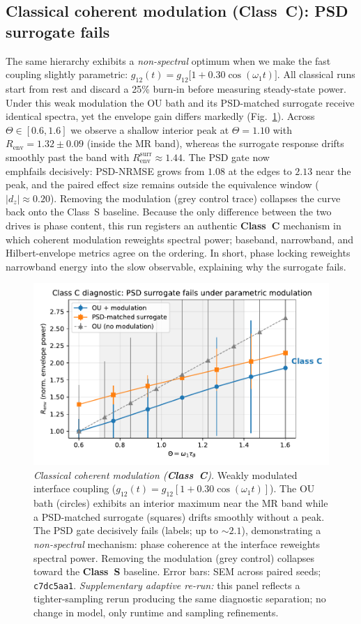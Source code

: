 \documentclass[11pt,letterpaper]{article}
\newcommand{\confighash}{c7dc5aa1}
\DeclareRobustCommand{\classS}{\textbf{Class~S}\xspace}
\DeclareRobustCommand{\classC}{\textbf{Class~C}\xspace}
\begin{document}
\subsection{Classical coherent modulation (\classC): PSD surrogate fails}
The same hierarchy exhibits a \emph{non-spectral} optimum when we make the fast coupling slightly parametric: $g_{12}(t)=g_{12}\bigl[1+0.30\cos(\omega_1 t)\bigr]$. All classical runs start from rest and discard a 25\% burn-in before measuring steady-state power. Under this weak modulation the OU bath and its PSD-matched surrogate receive identical spectra, yet the envelope gain differs markedly (Fig.~\ref{fig:classical_param}). Across $\Theta\in[0.6,1.6]$ we observe a shallow interior peak at $\Theta=1.10$ with $R_{\mathrm{env}}=1.32\pm0.09$ (inside the MR band), whereas the surrogate response drifts smoothly past the band with $R_{\mathrm{env}}^{\mathrm{surr}}\approx1.44$. The PSD gate now \\emph{fails} decisively: PSD-NRMSE grows from $1.08$ at the edges to $2.13$ near the peak, and the paired effect size remains outside the equivalence window ($|d_z|\approx0.20$). Removing the modulation (grey control trace) collapses the curve back onto the Class~S baseline. Because the only difference between the two drives is phase content, this run registers an authentic \classC{} mechanism in which coherent modulation reweights spectral power; baseband, narrowband, and Hilbert-envelope metrics agree on the ordering. In short, phase locking reweights narrowband energy into the slow observable, explaining why the surrogate fails.

\begin{figure}[t]
\centering
\includegraphics[width=0.8\linewidth]{figD_parametric_adaptive.pdf}
\caption{\emph{Classical coherent modulation (\classC).} Weakly modulated interface coupling ($g_{12}(t)=g_{12}[1+0.30\cos(\omega_1 t)]$). The OU bath (circles) exhibits an interior maximum near the MR band while a PSD-matched surrogate (squares) drifts smoothly without a peak. The PSD gate decisively fails (labels; up to $\sim2.1$), demonstrating a \emph{non-spectral} mechanism: phase coherence at the interface reweights spectral power. Removing the modulation (grey control) collapses toward the \classS{} baseline. Error bars: SEM across paired seeds; \texttt{\confighash}. \emph{Supplementary adaptive re-run:} this panel reflects a tighter-sampling rerun producing the same diagnostic separation; no change in model, only runtime and sampling refinements.}
\label{fig:classical_param}
\end{figure}
\end{document}
